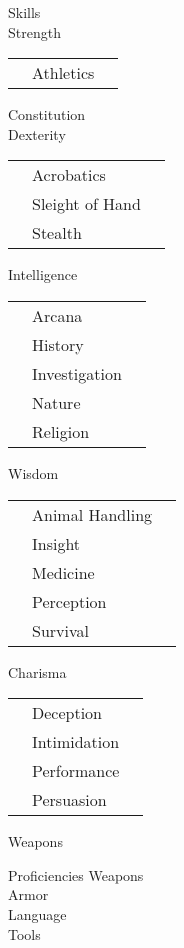 \documentclass[a4paper,10pt,bg=print]{dndbook} %
\begin{document}
	\begin{minipage}[t]{.25\linewidth}\Fontauri\normalsize
		{\huge Skills}\\
		\textcolor{titlered}{\large Strength}\\
		\begin{tabularx}{\textwidth}{lXr}
			&Athletics&\\
		\end{tabularx}
		\textcolor{titlered}{\large Constitution}\\
		\textcolor{titlered}{\large Dexterity}\\
		\begin{tabularx}{\textwidth}{lXr}
			&Acrobatics&\\
			&Sleight of Hand&\\
			&Stealth&\\
		\end{tabularx}
		\textcolor{titlered}{\large Intelligence}\\
		\begin{tabularx}{\textwidth}{lXr}
			&Arcana&\\
			&History&\\
			&Investigation&\\
			&Nature&\\
			&Religion&\\
		\end{tabularx}
		\textcolor{titlered}{\large Wisdom}\\
		\begin{tabularx}{\textwidth}{lXr}
			&Animal Handling&\\
			&Insight&\\
			&Medicine&\\
			&Perception&\\
			&Survival&\\
		\end{tabularx}
		\textcolor{titlered}{\large Charisma}\\
		\begin{tabularx}{\textwidth}{lXr}
    		&Deception&\\
			&Intimidation&\\
			&Performance&\\
			&Persuasion&\\
		\end{tabularx}
		\textcolor{titlered}{\large Weapons}\linebreak
	\end{minipage}%
	\begin{minipage}[t]{.25\linewidth}\Fontauri\normalsize
		{\huge Proficiencies}
		\textcolor{titlered}{\large Weapons}\vspace*{3cm}\\
		\textcolor{titlered}{\large Armor}\vspace*{3cm}\\
		\textcolor{titlered}{\large Language}\vspace*{3cm}\\
		\textcolor{titlered}{\large Tools}\\
	\end{minipage}%
\end{document}
